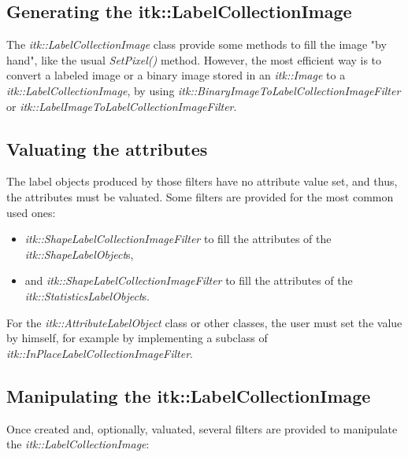 \documentclass{InsightArticle}
\begin{document}
\subsection{Generating the itk::LabelCollectionImage}

The {\em itk::LabelCollectionImage} class provide some methods to fill the
image "by hand", like the usual {\em SetPixel()} method. However, the most efficient way is to convert a labeled image or a binary
image stored in an {\em itk::Image} to a {\em itk::LabelCollectionImage}, by
using {\em itk::BinaryImageToLabelCollectionImageFilter} or {\em
itk::LabelImageToLabelCollectionImageFilter}.

\subsection{Valuating the attributes}

The label objects produced by those filters have no attribute value set, and
thus, the attributes must be valuated. Some filters are provided for the most
common used ones:

\begin{itemize}
  \item {\em itk::ShapeLabelCollectionImageFilter} to fill the
attributes of the {\em itk::ShapeLabelObject}s, 
  \item and {\em itk::ShapeLabelCollectionImageFilter} to fill the attributes of the {\em
itk::StatisticsLabelObject}s.
\end{itemize}

For the {\em itk::AttributeLabelObject} class or
other classes, the user must set the value by himself, for example by
implementing a subclass of {\em itk::InPlaceLabelCollectionImageFilter}.

\subsection{Manipulating the itk::LabelCollectionImage}

Once created and, optionally, valuated, several filters are provided to manipulate
the {\em itk::LabelCollectionImage}:
\end{document}

